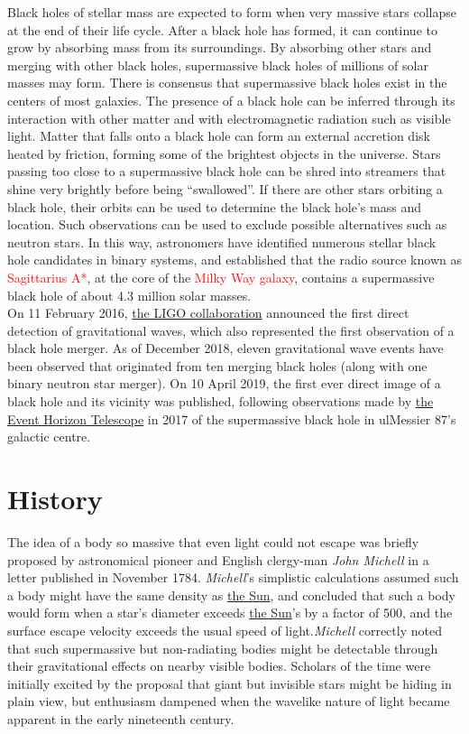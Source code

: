 \documentclass[twocolumn,12pt]{article}
\begin{document}
Black holes of stellar mass are expected to form when very massive stars collapse at the end of their life cycle. After a black hole has formed, it can continue to grow by absorbing mass from its surroundings. By absorbing
other stars and merging with other black holes, supermassive black holes of millions of solar masses may form. There is consensus that supermassive black holes exist in the
centers of most galaxies. The presence of a black hole can be inferred through its interaction with other matter and with electromagnetic radiation such as visible light. Matter that falls onto a black hole can form an external accretion disk heated by friction, forming some of the brightest objects in the universe. Stars passing too close to a supermassive black hole can be shred into streamers that shine very brightly before being “swallowed”. If there are other stars orbiting a black hole, their orbits can be used to determine the black hole’s mass and location. Such observations can be used to exclude possible alternatives such as neutron stars. In this way, astronomers have identified numerous stellar black hole candidates in binary systems, and established that the radio source known as \textcolor{red}{Sagittarius A*}, at the core of the \textcolor{red}{Milky Way galaxy}, contains a supermassive black hole of about 4.3 million solar masses.\\

On 11 February 2016, \ul{the LIGO collaboration} announced the first direct detection of gravitational waves, which also represented the first observation of a black hole merger. As of December 2018, eleven gravitational wave events have been observed that originated from ten merging black holes (along with one binary neutron star merger). On 10 April 2019, the first ever direct image of a black hole and its vicinity was published, following observations made by \ul{the Event Horizon Telescope} in 2017 of the supermassive black hole in ulMessier 87’s galactic centre.

\section{\textbf{History}}
The idea of a body so massive that even light could not escape was briefly proposed by astronomical pioneer and English clergy-man \textit{John Michell} in a letter published in November 1784. \textit{Michell}’s simplistic calculations assumed such a body might have the same density as \ul{the Sun}, and concluded that such a body would form when a star’s diameter exceeds \ul{the Sun}’s by a factor of 500, and the surface escape velocity exceeds the usual speed of light.\textit{Michell} correctly noted that such supermassive but non-radiating bodies might be detectable through their gravitational effects on nearby visible bodies. Scholars of the time were initially excited by the proposal that giant but invisible stars might be hiding in plain view, but enthusiasm dampened when the wavelike nature of light became apparent in the early nineteenth century.
\end{document}
